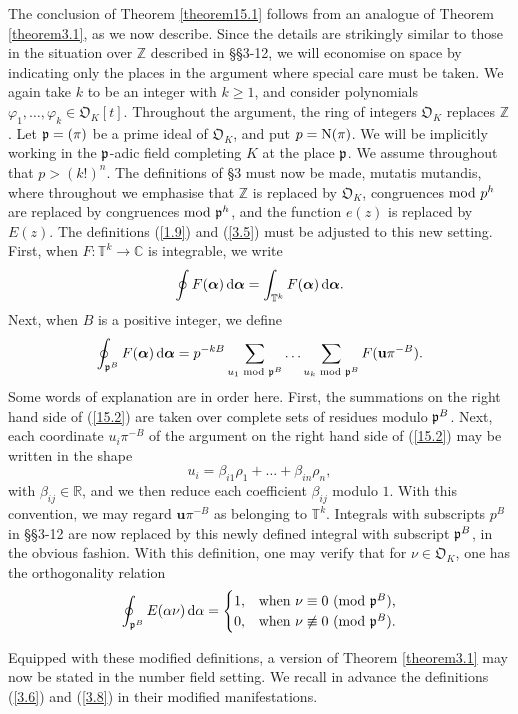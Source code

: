 \documentclass[12pt,reqno]{amsart}
\theoremstyle{definition}
\theoremstyle{remark}
\numberwithin{equation}{section}
\newcommand{\mmod}[1]{\,\,(\text{\rm mod}\,\,#1)}
\newcommand{\nmod}[1]{\,\,\text{\rm mod}\,\,#1}
\def\bfu{{\mathbf u}}
\def\dbC{{\mathbb C}}\def\dbD{{\mathbb D}}
\def\dbR{{\mathbb R}}\def\dbT{{\mathbb T}}
\def\dbZ{{\mathbb Z}}\def\dbQ{{\mathbb Q}}
\def\grO{{\mathfrak O}}
\def\alp{{\alpha}} \def\bfalp{{\boldsymbol \alpha}}
\def\bet{{\beta}}  \def\bfbet{{\boldsymbol \beta}}
\def\d{{\,{\rm d}}}
\begin{document}
The conclusion of Theorem \ref{theorem15.1} follows from an analogue of Theorem 
\ref{theorem3.1}, as we now describe. Since the details are strikingly similar to those in the 
situation over $\dbZ$ described in \S\S3-12, we will economise on space by indicating only 
the places in the argument where special care must be taken. We again take $k$ to be an 
integer with $k\ge 1$, and consider polynomials $\varphi_1,\ldots ,\varphi_k\in \grO_K[t]$. 
Throughout the argument, the ring of integers $\grO_K$ replaces $\dbZ$. Let ${\mathfrak p}=(\pi)$ 
be a prime ideal of $\grO_K$, and put $p={\rm N}(\pi)$. We will be implicitly working in the 
${\mathfrak p}$-adic field completing $K$ at the place ${\mathfrak p}$. We assume throughout that 
$p>(k!)^n$. The definitions of \S3 must now be made, mutatis mutandis, where throughout 
we emphasise that $\dbZ$ is replaced by $\grO_K$, congruences$\nmod{p^h}$ are 
replaced by congruences$\nmod{\grp^h}$, and the function $e(z)$ is replaced by $E(z)$. 
The definitions (\ref{1.9}) and (\ref{3.5}) must be adjusted to this new setting. First, when 
$F:\dbT^k\rightarrow \dbC$ is integrable, we write
$$\oint F(\bfalp)\d\bfalp =\int_{\dbT^k}F(\bfalp)\d\bfalp .$$
Next, when $B$ is a positive integer, we define
\begin{equation}\label{15.2}
\oint_{\grp^B}F(\bfalp)\d\bfalp =p^{-kB}\sum_{u_1\nmod{\grp^B}}\ldots 
\sum_{u_k\nmod{\grp^B}}F(\bfu \pi^{-B}).
\end{equation}
Some words of explanation are in order here. First, the summations on the right hand side 
of (\ref{15.2}) are taken over complete sets of residues modulo ${\mathfrak p}^B$. Next, each 
coordinate $u_i\pi^{-B}$ of the argument on the right hand side of (\ref{15.2}) may be 
written in the shape
$$u_i=\bet_{i1}\rho_1+\ldots +\bet_{in}\rho_n,$$
with $\bet_{ij}\in \dbR$, and we then reduce each coefficient $\bet_{ij}$ modulo $1$. With 
this convention, we may regard $\bfu \pi^{-B}$ as belonging to $\dbT^k$. Integrals with 
subscripts $p^B$ in \S\S3-12 are now replaced by this newly defined integral with subscript 
${\mathfrak p}^B$, in the obvious fashion. With this definition, one may verify that for $\nu \in 
\grO_K$, one has the orthogonality relation
$$\oint_{\grp^B}E(\alp \nu)\d\alp =\begin{cases} 1,&\text{when 
$\nu\equiv 0\mmod{\grp^B}$,}\\
0,&\text{when $\nu\not\equiv 0\mmod{\grp^B}$.}\end{cases}$$

\par Equipped with these modified definitions, a version of Theorem \ref{theorem3.1} may 
now be stated in the number field setting. We recall in advance the definitions (\ref{3.6}) 
and (\ref{3.8}) in their modified manifestations.
\end{document}

